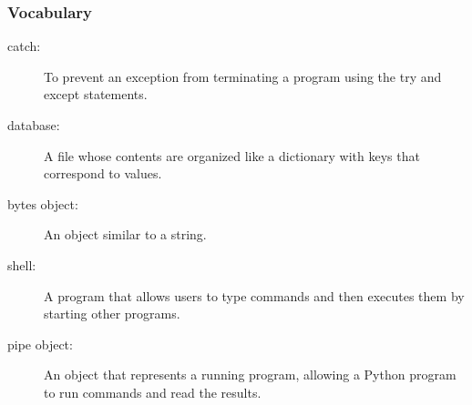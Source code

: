 \documentclass{beamer}
\newcommand{\li}{\item}
\newcommand{\bfr}[1]{\begin{frame}[fragile]\frametitle{{ #1 }}}
\begin{document}
\bfr{Vocabulary}
\begin{description}
\li[catch:]
To prevent an exception from terminating a program using the try and except statements.
\li[database:]
A file whose contents are organized like a dictionary with keys that correspond to values.
\li[bytes object:]
An object similar to a string.
\li[shell:]
A program that allows users to type commands and then executes them by starting other programs.
\li[pipe object:]
An object that represents a running program, allowing a Python program to run commands and read the results.

\end{description}

\end{frame}
\end{document}
